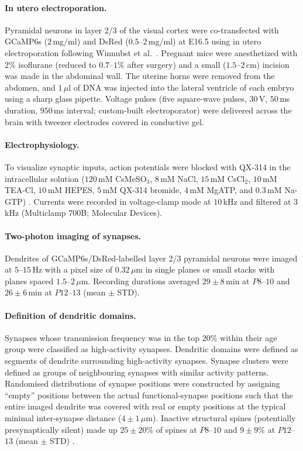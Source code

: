 \documentclass[11pt]{article}
\begin{document}
\paragraph{In utero electroporation.} Pyramidal neurons in layer 2/3 of the visual cortex were co-transfected with GCaMP6s \cite{chen2013gcamp6} ($2$\,mg/ml) and DsRed ($0.5$--$2$\,mg/ml) at E16.5 using in utero electroporation following Winnubst et al.\ \cite{winnubst2015,saito2001invivo}. Pregnant mice were anesthetized with $2\%$ isoflurane (reduced to $0.7$--$1\%$ after surgery) and a small ($1.5$--$2$\,cm) incision was made in the abdominal wall. The uterine horns were removed from the abdomen, and $1\,\mu\mathrm{l}$ of DNA was injected into the lateral ventricle of each embryo using a sharp glass pipette. Voltage pulses (five square-wave pulses, $30$\,V, $50$\,ms duration, $950$\,ms interval; custom-built electroporator) were delivered across the brain with tweezer electrodes covered in conductive gel.

\paragraph{Electrophysiology.} To visualize synaptic inputs, action potentials were blocked with QX-314 in the intracellular solution ($120$\,mM CsMeSO$_3$, $8$\,mM NaCl, $15$\,mM CsCl$_2$, $10$\,mM TEA-Cl, $10$\,mM HEPES, $5$\,mM QX-314 bromide, $4$\,mM MgATP, and $0.3$\,mM Na-GTP) \cite{takahashi2012,winnubst2015}. Currents were recorded in voltage-clamp mode at $10$\,kHz and filtered at $3$\,kHz (Multiclamp 700B; Molecular Devices).

\paragraph{Two-photon imaging of synapses.} Dendrites of GCaMP6s/DsRed-labelled layer 2/3 pyramidal neurons were imaged at $5$--$15$\,Hz with a pixel size of $0.32\,\mu\mathrm{m}$ in single planes or small stacks with planes spaced $1.5$--$2\,\mu\mathrm{m}$. Recording durations averaged $29 \pm 8$\,min at $P8$--$10$ and $26 \pm 6$\,min at $P12$--$13$ (mean $\pm$ STD).

\paragraph{Definition of dendritic domains.} Synapses whose transmission frequency was in the top $20\%$ within their age group were classified as high-activity synapses. Dendritic domains were defined as segments of dendrite surrounding high-activity synapses. Synapse clusters were defined as groups of neighbouring synapses with similar activity patterns. Randomised distributions of synapse positions were constructed by assigning ``empty'' positions between the actual functional-synapse positions such that the entire imaged dendrite was covered with real or empty positions at the typical minimal inter-synapse distance ($4 \pm 1\,\mu\mathrm{m}$). Inactive structural spines (potentially presynaptically silent) made up $25 \pm 20\%$ of spines at $P8$--$10$ and $9 \pm 9\%$ at $P12$--$13$ (mean $\pm$ STD) \cite{voronin2004silent}.
\end{document}
